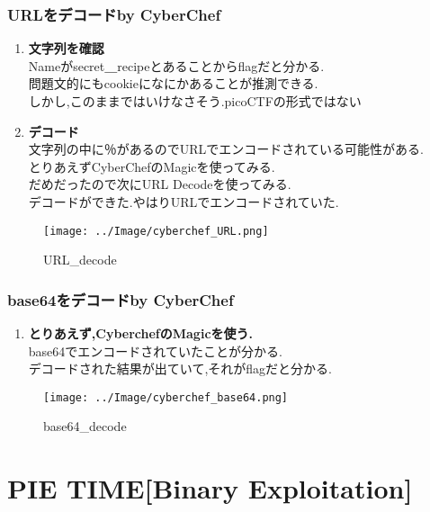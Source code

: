 \documentclass[dvipdfmx]{jsarticle}
\begin{document}
\subsubsection{URLをデコードby CyberChef}
\begin{enumerate}
	\item \textbf{文字列を確認}\\
	Nameがsecret＿recipeとあることからflagだと分かる.\\
	問題文的にもcookieになにかあることが推測できる.\\
	しかし,このままではいけなさそう.picoCTF{}の形式ではない
	\item \textbf{デコード}\\
	文字列の中に％があるのでURLでエンコードされている可能性がある.\\
	とりあえずCyberChefのMagicを使ってみる.\\
	だめだったので次にURL Decodeを使ってみる.\\
	デコードができた.やはりURLでエンコードされていた.\\
\end{enumerate}

\begin{figure}[h]
\begin{center}
\texttt{[image: ../Image/cyberchef\_URL.png]}
\caption{URL\_decode}
\end{center}
\end{figure}


\subsubsection{base64をデコードby CyberChef}
\begin{enumerate}
	\item \textbf{とりあえず,CyberchefのMagicを使う.}\\
	base64でエンコードされていたことが分かる.\\
	デコードされた結果が出ていて,それがflagだと分かる.
\end{enumerate}

\begin{figure}[t]
\begin{center}
\texttt{[image: ../Image/cyberchef\_base64.png]}
\caption{base64\_decode}
\end{center}
\end{figure}
\FloatBarrier

\section{PIE TIME[Binary Exploitation]}
\end{document}

